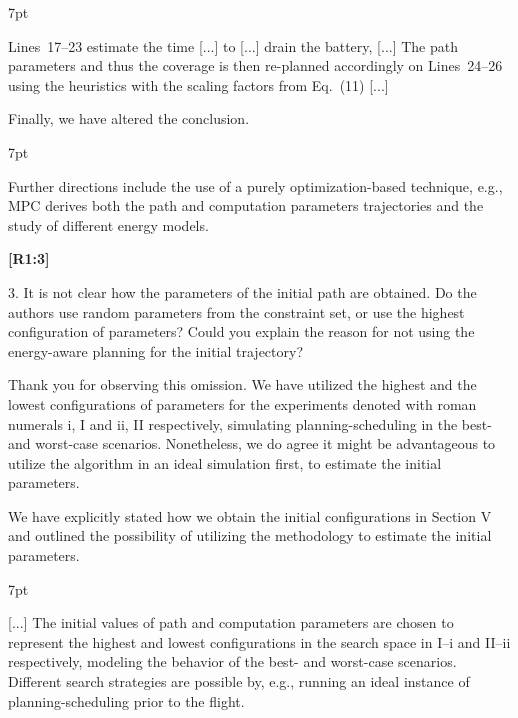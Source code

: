 \documentclass[10pt]{letter}
\newenvironment{formal}{%
  \def\FrameCommand{%
    \hspace{1pt}%
    {\color{red}\vrule width 2pt}%
    {\color{formalshade}\vrule width 4pt}%
    \colorbox{formalshade}%
  }%
  \MakeFramed{\advance\hsize-\width\FrameRestore}%
  \noindent\hspace{-4.55pt}%
  \begin{adjustwidth}{}{7pt}%
  \vspace{2pt}\vspace{2pt}%
}
{%
  \vspace{2pt}\end{adjustwidth}\endMakeFramed%
}
\begin{document}
{\begin{formal}
  Lines~{\color{red}17}--{\color{red}23} estimate the time [...] to [...] drain the battery, [...] The {\color{blue}path parameters and thus the} coverage is then re{\color{blue}-}planned accordingly on Lines~{\color{red}24}--{\color{red}26} using {\color{blue} the heuristics with the} %
  scaling factors from Eq.~({\color{red}11}) [...]

  \vspace*{1ex}
  \end{formal}

  Finally, we have altered the conclusion.

  \begin{formal}
  \color{black}
  Further directions include {\color{blue}the use of a purely optimization-based technique, e.g., MPC derives both the path and computation parameters trajectories and} the study of different energy models.
  \vspace*{1ex}
  \end{formal}
}

{\hspace*{-4.5em}\textbf{[R1:3]}\vspace*{-1.9em}}

3. It is not clear how the parameters of the initial path are obtained. Do the authors use random parameters from the constraint set, or use the highest configuration of parameters? Could you explain the reason for not using the energy-aware planning for the initial trajectory?

{\color{blue}

{\hspace*{-4.5em}{[R1:3]}\vspace*{-1.9em}}

Thank you for observing this omission. We have utilized the highest and the lowest configurations of parameters for the experiments denoted with roman numerals i, I and ii, II respectively, simulating planning-scheduling in the best- and worst-case scenarios. Nonetheless, we do agree it might be advantageous to utilize the algorithm in an ideal simulation first, to estimate the initial parameters.

We have explicitly stated how we obtain the initial configurations in Section V and outlined the possibility of utilizing the methodology to estimate the initial parameters.

\begin{formal}
  \color{black} [...] {\color{blue} The initial values of path and computation parameters are chosen to represent the highest and lowest configurations in the search space in {\color{red}I}--{\color{red}i} and {\color{red}II}--{\color{red}ii} respectively, modeling the behavior of the best- and worst-case scenarios. Different search strategies are possible by, e.g., running an ideal instance of planning-scheduling prior to the flight.}
  \vspace*{1ex}
\end{formal}

}
\end{document}
